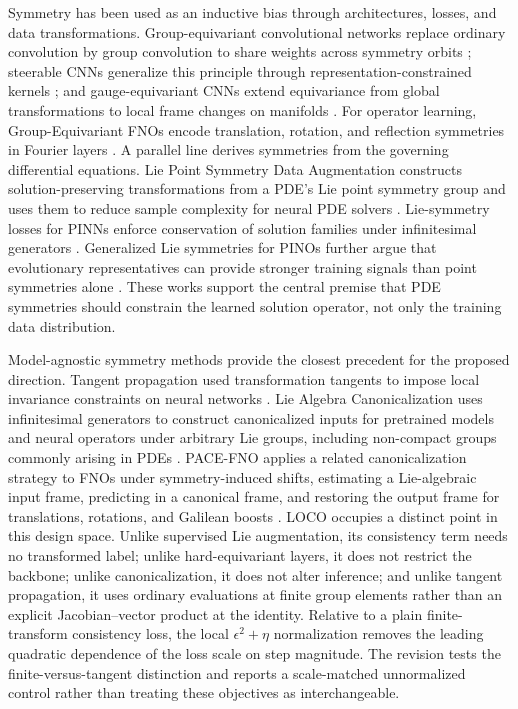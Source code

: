Symmetry has been used as an inductive bias through architectures, losses, and data transformations. Group-equivariant convolutional networks replace ordinary convolution by group convolution to share weights across symmetry orbits \citep{cohen2016gcnn}; steerable CNNs generalize this principle through representation-constrained kernels \citep{weiler2019e2cnn}; and gauge-equivariant CNNs extend equivariance from global transformations to local frame changes on manifolds \citep{cohen2019gauge}. For operator learning, Group-Equivariant FNOs encode translation, rotation, and reflection symmetries in Fourier layers \citep{helwig2023gfno}. A parallel line derives symmetries from the governing differential equations. Lie Point Symmetry Data Augmentation constructs solution-preserving transformations from a PDE's Lie point symmetry group and uses them to reduce sample complexity for neural PDE solvers \citep{brandstetter2022lpsda}. Lie-symmetry losses for PINNs enforce conservation of solution families under infinitesimal generators \citep{akhoundsadegh2023liepinn}. Generalized Lie symmetries for PINOs further argue that evolutionary representatives can provide stronger training signals than point symmetries alone \citep{wang2025generalizedliepino}. These works support the central premise that PDE symmetries should constrain the learned solution operator, not only the training data distribution.

Model-agnostic symmetry methods provide the closest precedent for the proposed direction. Tangent propagation used transformation tangents to impose local invariance constraints on neural networks \citep{simard1991tangentprop}. Lie Algebra Canonicalization uses infinitesimal generators to construct canonicalized inputs for pretrained models and neural operators under arbitrary Lie groups, including non-compact groups commonly arising in PDEs \citep{shumaylov2025lielac}. PACE-FNO applies a related canonicalization strategy to FNOs under symmetry-induced shifts, estimating a Lie-algebraic input frame, predicting in a canonical frame, and restoring the output frame for translations, rotations, and Galilean boosts \citep{xu2026pacefno}. LOCO occupies a distinct point in this design space. Unlike supervised Lie augmentation, its consistency term needs no transformed label; unlike hard-equivariant layers, it does not restrict the backbone; unlike canonicalization, it does not alter inference; and unlike tangent propagation, it uses ordinary evaluations at finite group elements rather than an explicit Jacobian--vector product at the identity. Relative to a plain finite-transform consistency loss, the local \(\epsilon^2+\eta\) normalization removes the leading quadratic dependence of the loss scale on step magnitude. The revision tests the finite-versus-tangent distinction and reports a scale-matched unnormalized control rather than treating these objectives as interchangeable.
